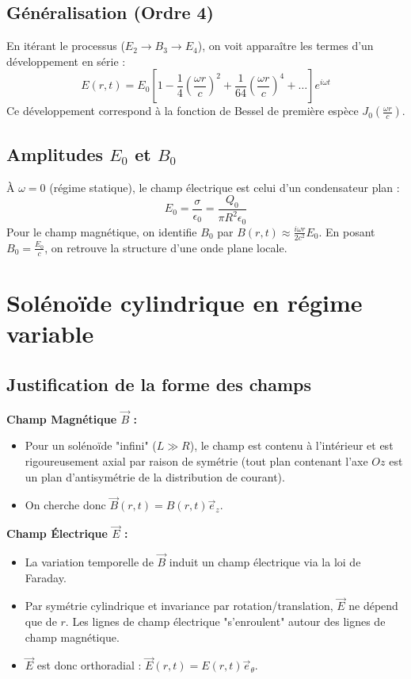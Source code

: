 \documentclass[french]{yLectureNote}
\renewcommand{\vec}{\overrightarrow}
\begin{document}
\subsection{Généralisation (Ordre 4)}
En itérant le processus ($E_2 \to B_3 \to E_4$), on voit apparaître les termes d'un développement en série :
\[ E(r,t) = E_0 \left[ 1 - \frac{1}{4} \left( \frac{\omega r}{c} \right)^2 + \frac{1}{64} \left( \frac{\omega r}{c} \right)^4 + \dots \right] e^{i\omega t} \]
Ce développement correspond à la fonction de Bessel de première espèce $J_0(\frac{\omega r}{c})$.

\subsection{Amplitudes $E_0$ et $B_0$}
À $\omega = 0$ (régime statique), le champ électrique est celui d'un condensateur plan :
\[ E_0 = \frac{\sigma}{\epsilon_0} = \frac{Q_0}{\pi R^2 \epsilon_0} \]
Pour le champ magnétique, on identifie $B_0$ par $B(r,t) \approx \frac{i \omega r}{2c^2} E_0$. En posant $B_0 = \frac{E_0}{c}$, on retrouve la structure d'une onde plane locale.

\section{Solénoïde cylindrique en régime variable}

\subsection{Justification de la forme des champs}

\textbf{Champ Magnétique $\vec{B}$ :} 
\begin{itemize}
    \item Pour un solénoïde "infini" ($L \gg R$), le champ est contenu à l'intérieur et est rigoureusement axial par raison de symétrie (tout plan contenant l'axe $Oz$ est un plan d'antisymétrie de la distribution de courant). 
    \item On cherche donc $\vec{B}(r,t) = B(r,t) \vec{e}_z$.
\end{itemize}

\textbf{Champ Électrique $\vec{E}$ :} 
\begin{itemize}
    \item La variation temporelle de $\vec{B}$ induit un champ électrique via la loi de Faraday. 
    \item Par symétrie cylindrique et invariance par rotation/translation, $\vec{E}$ ne dépend que de $r$. Les lignes de champ électrique "s'enroulent" autour des lignes de champ magnétique.
    \item $\vec{E}$ est donc orthoradial : $\vec{E}(r,t) = E(r,t) \vec{e}_\theta$.
\end{itemize}
\end{document}
